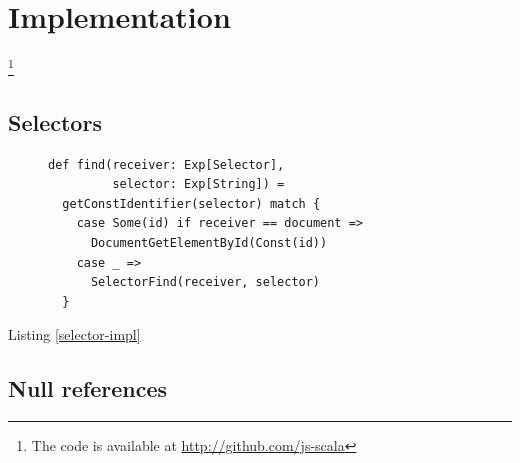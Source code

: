 \documentclass[preprint]{sigplanconf}
\begin{document}
% 
% 
% 
% 

\section{Implementation}
\label{implementation}

\footnote{The code is available at \href{http://github.com/js-scala}{http://github.com/js-scala}}

\subsection{Selectors}

\begin{figure}
\begin{lstlisting}[label=selector-impl,caption=Selectors optimization]
def find(receiver: Exp[Selector],
         selector: Exp[String]) =
  getConstIdentifier(selector) match {
    case Some(id) if receiver == document =>
      DocumentGetElementById(Const(id))
    case _ =>
      SelectorFind(receiver, selector)
  }
\end{lstlisting}
\end{figure}

Listing \ref{selector-impl}

\subsection{Null references}
\end{document}
